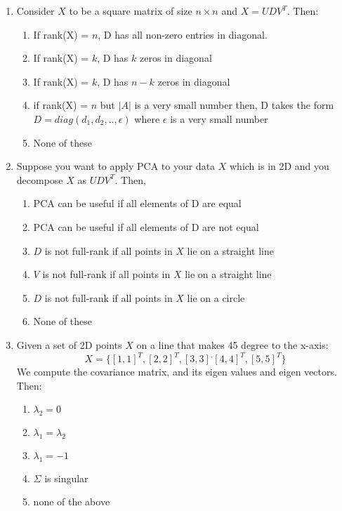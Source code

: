\documentclass{article}
\begin{document}
\begin{enumerate}
    \item Consider $X$ to be a square matrix of size $n\times n$ and $X=UDV^T$.
    Then:
    \begin{enumerate}
        \item If rank(X) = $n$, D has all non-zero entries in diagonal.
        \item If rank(X) = $k$, D has $k$ zeros in diagonal
        \item If rank(X) = $k$, D has $n-k$ zeros in diagonal
        \item if rank(X) = $n$ but $\vert A \vert $ is a very small number then, D takes the form $D=diag(d_1,d_2,..,\epsilon)$ where $\epsilon$ is a very small number
        \item None of these
    \end{enumerate}

    \item Suppose you want to apply PCA to your data $X$
    which is in 2D and you decompose $X$ as $UDV^T$. Then,
    \begin{enumerate}
        \item PCA can be useful if all elements of D are equal
        \item PCA can be useful if all elements of D are not equal
        \item   $D$ is not full-rank if all points in $X$ lie on a straight line
        \item   $V$ is not full-rank if all points in $X$ lie on a straight line
        \item   $D$ is not full-rank if all points in $X$ lie on a circle
        \item None of these
    \end{enumerate}

    \item Given a set of 2D points $X$ on a line that makes 45 degree to the x-axis:
    \[ X = \{ [1,1]^T, [2,2]^T, [3,3]^, [4,4]^T, [5,5]^T \}\]
    We compute the covariance matrix, and its eigen values and eigen vectors. Then:

    \begin{enumerate}
        \item  $\lambda_2 = 0$
        \item  $\lambda_1 = \lambda_2$
        \item  $\lambda_1 = -1$
        \item  $\Sigma$ is singular
        \item none of the above
    \end{enumerate}


\end{enumerate}
\end{document}
